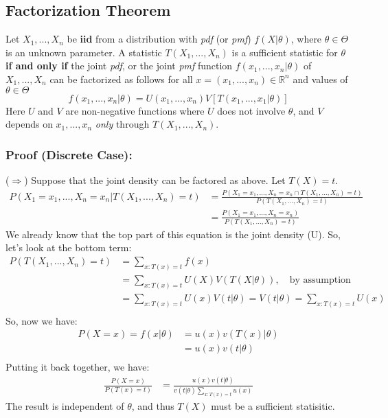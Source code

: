 \documentclass{article}
\begin{document}
\subsection{Factorization Theorem}
Let $X_1,...,X_n$ be \textbf{iid} from a distribution with \textit{pdf} (or \textit{pmf}) $f(X|\theta)$, where $\theta \in \Theta$ is an unknown parameter. A statistic $T(X_1,...,X_n)$ is a sufficient statistic for $\theta$ \textbf{if and only if} the joint \textit{pdf}, or the joint \textit{pmf} function $f(x_1,...,x_n|\theta)$ of $X_1,...,X_n$ can be factorized as follows for all $x = (x_1,...,x_n) \in \mathbb{R}^n$ and values of $\theta \in \Theta$
\begin{equation*}
    f(x_1,...,x_n|\theta) = U(x_1,...,x_n) V\left[ T(x_1,...,x_1|\theta) \right]
\end{equation*}
Here $U$ and $V$ are non-negative functions where $U$ does not involve $\theta$, and $V$ depends on $x_1,...,x_n$ \textit{only} through $T(X_1,...,X_n)$.

\subsubsection*{Proof (Discrete Case):}
($\Rightarrow$) Suppose that the joint density can be factored as above. Let $T(X) = t$.
\begin{equation*}
    \begin{split}
        P(X_1=x_1,...,X_n=x_n|T(X_1,...,X_n) = t) &= \frac{P(X_1=x_1,...,X_n=x_n \cap T(X_1,...,X_n) = t)}{P(T(X_1,...,X_n)=t)}\\
        &= \frac{P(X_1=x_1,...,X_n=x_n)}{P(T(X_1,...,X_n)=t)}
    \end{split}
\end{equation*}
We already know that the top part of this equation is the joint density (U). So, let's look at the bottom term:
\begin{equation*}
    \begin{split}
        P(T(X_1,...,X_n)=t) &= \sum_{x:T(x)=t} f(x)\\
        &= \sum_{x:T(x)=t} U(X) V(T(X|\theta)),\quad\text{by assumption}\\
        &= \sum_{x:T(x)=t} U(x) V(t|\theta) = V(t|\theta) = \sum_{x:T(x)=t} U(x)\\
    \end{split}
\end{equation*}
So, now we have:
\begin{equation*}
\begin{split}
    P(X=x) = f(x|\theta) &= u(x)v(T(x)|\theta)\\
    &= u(x) v(t|\theta)\\
\end{split}
\end{equation*}
Putting it back together, we have:
\begin{equation*}
\begin{split}
    \frac{P(X=x)}{P(T(x)=t)} &= \frac{u(x)v(t|\theta)}{v(t|\theta) \sum_{x:T(x)=t} u(x)}
\end{split}
\end{equation*}
The result is independent of $\theta$, and thus $T(X)$ must be a sufficient statisitic.
\end{document}
